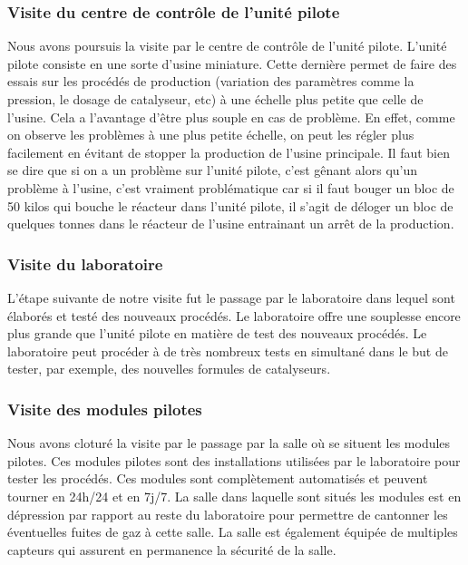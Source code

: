 \subsubsection{Visite du centre de contrôle de l'unité pilote}
Nous avons poursuis la visite par le centre de contrôle de l'unité pilote. L'unité pilote consiste en une sorte d'usine miniature. Cette dernière permet de faire des essais sur les procédés de production (variation des paramètres comme la pression, le dosage de catalyseur, etc) à une échelle plus petite que celle de l'usine. Cela a l'avantage d'être plus souple en cas de problème. En effet, comme on observe les problèmes à une plus petite échelle, on peut les régler plus facilement en évitant de stopper la production de l'usine principale. Il faut bien se dire que si on a un problème sur l'unité pilote, c'est gênant alors qu'un problème à l'usine, c'est vraiment problématique car si il faut bouger un bloc de 50 kilos qui bouche le réacteur dans l'unité pilote, il s'agit de déloger un bloc de quelques tonnes dans le réacteur de l'usine entrainant un arrêt de la production.
\subsubsection{Visite du laboratoire}
L'étape suivante de notre visite fut le passage par le laboratoire dans lequel sont élaborés et testé des nouveaux procédés. Le laboratoire offre une souplesse encore plus grande que l'unité pilote en matière de test des nouveaux procédés. Le laboratoire peut procéder à de très nombreux tests en simultané dans le but de tester, par exemple, des nouvelles formules de catalyseurs.
\subsubsection{Visite des modules pilotes}
Nous avons cloturé la visite par le passage par la salle où se situent les modules pilotes. Ces modules pilotes sont des installations utilisées par le laboratoire pour tester les procédés. Ces modules sont complètement automatisés et peuvent tourner en 24h/24 et en 7j/7. La salle dans laquelle sont situés les modules est en dépression par rapport au reste du laboratoire pour permettre de cantonner les éventuelles fuites de gaz à cette salle. La salle est également équipée de multiples capteurs qui assurent en permanence la sécurité de la salle.

